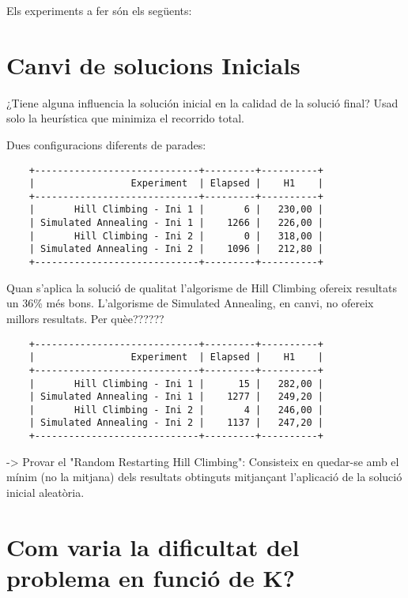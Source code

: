 
Els experiments a fer són els següents:

\section{Canvi de solucions Inicials} %
\label{sec:expsolini}

	¿Tiene alguna influencia la solución inicial en la calidad de la solució final? Usad solo
	la heurística que minimiza el recorrido total.

Dues configuracions diferents de parades:

\begin{verbatim}
	+-----------------------------+---------+----------+
	|                 Experiment  | Elapsed |    H1    |
	+-----------------------------+---------+----------+
	|       Hill Climbing - Ini 1 |       6 |   230,00 |
	| Simulated Annealing - Ini 1 |    1266 |   226,00 |
	|       Hill Climbing - Ini 2 |       0 |   318,00 |
	| Simulated Annealing - Ini 2 |    1096 |   212,80 |
	+-----------------------------+---------+----------+
\end{verbatim}
	
	Quan s'aplica la solució de qualitat l'algorisme de Hill Climbing ofereix resultats un 36\% més bons. L'algorisme de Simulated Annealing, en canvi, no ofereix millors resultats. Per quèe??????
	
\begin{verbatim}
	+-----------------------------+---------+----------+
	|                 Experiment  | Elapsed |    H1    |
	+-----------------------------+---------+----------+
	|       Hill Climbing - Ini 1 |      15 |   282,00 |
	| Simulated Annealing - Ini 1 |    1277 |   249,20 |
	|       Hill Climbing - Ini 2 |       4 |   246,00 |
	| Simulated Annealing - Ini 2 |    1137 |   247,20 |
	+-----------------------------+---------+----------+
\end{verbatim}	
	
	-> Provar el "Random Restarting Hill Climbing": Consisteix en quedar-se amb el mínim (no la mitjana) dels resultats obtinguts mitjançant l'aplicació de la solució inicial aleatòria.
	

\section{Com varia la dificultat del problema en funció de K?} %
\label{sec:expk}

